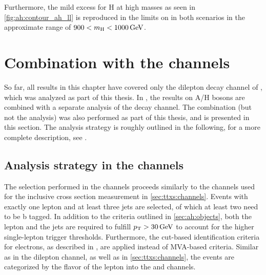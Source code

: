 
Furthermore, the mild excess for H at high masses as seen in \cref{fig:ah:contour_ah_ll} is reproduced in the limits on \gHtt in both scenarios in the approximate range of $900 < \mH < \SI{1000}{\GeV}$.

\section{Combination with the \texorpdfstring{\ljets}{l+jets} channels}
\label{sec:ah:combination}

So far, all results in this chapter have covered only the dilepton decay channel of \ttbar, which was analyzed as part of this thesis. In , the results on A/H bosons are combined with a separate analysis of the \ljets decay channel. The combination (but not the \ljets analysis) was also performed as part of this thesis, and is presented in this section. The \ljets analysis strategy is roughly outlined in the following, for a more complete description, see .

\subsection{Analysis strategy in the \texorpdfstring{\ljets}{l+jets} channels}
\label{sec:ah:ljets}

The selection performed in the \ljets channels proceeds similarly to the \ljets channels used for the inclusive \ttbar cross section measurement in \cref{sec:ttxs:channels}. 
Events with exactly one lepton and at least three jets are selected, of which at least two need to be b tagged. In addition to the criteria outlined in \cref{sec:ah:objects}, both the lepton and the jets are required to fulfill $\pt > \SI{30}{\GeV}$ to account for the higher single-lepton trigger thresholds. Furthermore, the cut-based identification criteria for electrons, as described in , are applied instead of MVA-based criteria. Similar as in the dilepton channel, as well as in \cref{sec:ttxs:channels}, the events are categorized by the flavor of the lepton into the \ejets and \mujets channels.

